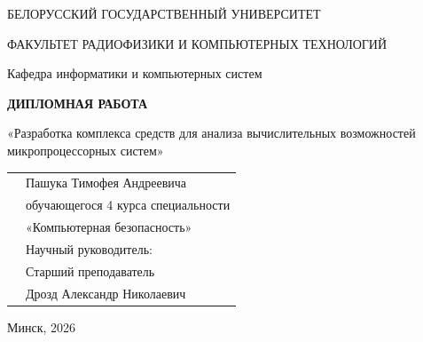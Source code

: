 \begin{titlepage}
\begin{center}
\large
БЕЛОРУССКИЙ ГОСУДАРСТВЕННЫЙ УНИВЕРСИТЕТ
\vspace{1cm}

ФАКУЛЬТЕТ РАДИОФИЗИКИ И КОМПЬЮТЕРНЫХ ТЕХНОЛОГИЙ

\vspace{1cm}

Кафедра информатики и компьютерных систем

\vspace{2cm}

\textbf{\large ДИПЛОМНАЯ РАБОТА}

\vspace{0.5cm}

«Разработка комплекса средств для анализа вычислительных возможностей микропроцессорных систем»

\end{center}

\vspace{3cm}

\begin{flushright}
\begin{tabular}{ll}
& Пашука Тимофея Андреевича \\
& обучающегося 4 курса специальности \\
& «Компьютерная безопасность»
\vspace{0.5cm}
\\ & Научный руководитель: \\
& Старший преподаватель \\
& Дрозд Александр Николаевич \\
\end{tabular}
\end{flushright}

\vspace{\fill}

\begin{center}
Минск, 2026
\end{center}
\end{titlepage}
